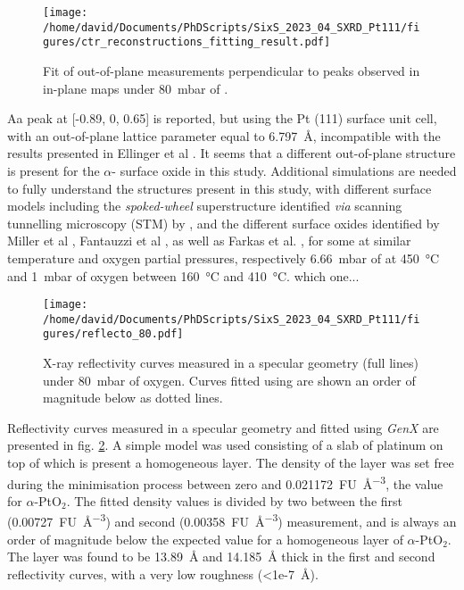 \begin{figure}[!htb]
    \centering
    \texttt{[image: /home/david/Documents/PhDScripts/SixS\_2023\_04\_SXRD\_Pt111/figures/ctr\_reconstructions\_fitting\_result.pdf]}
    \caption{
        Fit of out-of-plane measurements perpendicular to peaks observed in in-plane maps under \qty{80}{\milli\bar} of .
    }
    \label{fig:LScans80Fit}
\end{figure}

Aa peak at [-0.89, 0, 0.65] is reported, but using the Pt (111) surface unit cell, with an out-of-plane lattice parameter equal to \qty{6.797}{\angstrom}, incompatible with the results presented in Ellinger et al \parencite*{Ellinger2008}.
It seems that a different out-of-plane structure is present for the $\alpha$- surface oxide in this study.
Additional simulations are needed to fully understand the structures present in this study, with different surface models including the \textit{spoked-wheel} superstructure identified \textit{via} scanning tunnelling microscopy (STM) by \cite{VanSpronsen2017, Boden2022}, and the different surface oxides identified by Miller et al \parencite*{Miller2011, Miller2014}, Fantauzzi et al \parencite*{Fantauzzi2017}, as well as Farkas et al. \parencite*{Farkas2017}, for some at similar temperature and oxygen partial pressures, respectively \qty{6.66}{\milli\bar} of  at \qty{450}{\degreeCelsius} and \qty{1}{\milli\bar} of oxygen between \qty{160}{\degreeCelsius} and \qty{410}{\degreeCelsius}.
\textcolor{Important}{which one...}

\begin{figure}[!htb]
    \centering
    \texttt{[image: /home/david/Documents/PhDScripts/SixS\_2023\_04\_SXRD\_Pt111/figures/reflecto\_80.pdf]}
    \caption{
    	X-ray reflectivity curves measured in a specular geometry (full lines) under \qty{80}{\milli\bar} of oxygen.
    	Curves fitted using  are shown an order of magnitude below as dotted lines.
    }
    \label{fig:Reflecto80}
\end{figure}

Reflectivity curves measured in a specular geometry and fitted using \textit{GenX} are presented in fig. \ref{fig:Reflecto80}.
A simple model was used consisting of a slab of platinum on top of which is present a homogeneous layer.
The density of the layer was set free during the minimisation process between zero and \qty{0.021172}{FU\per\cubic\angstrom}, the value for $\alpha$-PtO$_2$.
The fitted density values is divided by two between the first (\qty{0.00727}{FU\per\cubic\angstrom}) and second (\qty{0.00358}{FU\per\cubic\angstrom}) measurement, and is always an order of magnitude below the expected value for a homogeneous layer of $\alpha$-PtO$_2$.
The layer was found to be \qty{13.89}{\angstrom} and \qty{14.185}{\angstrom} thick in the first and second reflectivity curves, with a very low roughness (\qty{<1e-7}{\angstrom}).


